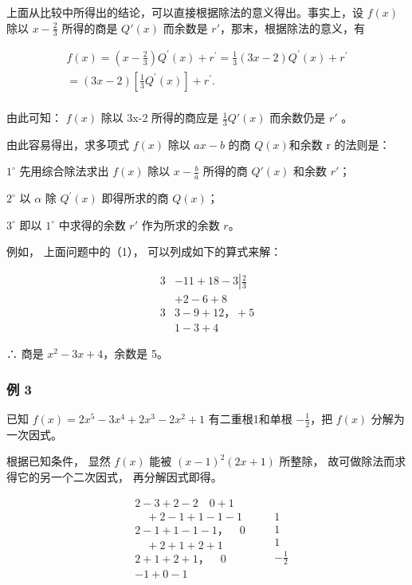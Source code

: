 上面从比较中所得出的结论，可以直接根据除法的意义得出。事实上，设
\(f(x)\) 除以 \(x - \frac{2}{3}\) 所得的商是 \(Q'(x)\) 而余数是
\(r'\)，那末，根据除法的意义，有

\[
\begin{array}{l} f (x) = \left(x - \frac {2}{3}\right) Q ^ {\prime} (x) + r ^ {\prime} = \frac {1}{3} (3 x - 2) Q ^ {\prime} (x) + r ^ {\prime} \\ = (3 x - 2) \left[ \frac {1}{3} Q ^ {\prime} (x) \right] + r ^ {\prime}. \\ \end{array}
\]

由此可知： \(f(x)\) 除以 3x-2 所得的商应是 \(\frac{1}{3}Q'(x)\)
而余数仍是 \(r'\) 。

由此容易得出，求多项式 \(f(x)\) 除以 \(ax - b\) 的商 \(Q(x)\)和余数 r
的法则是：

\(1^{\circ}\) 先用综合除法求出 \(f(x)\) 除以 \(x - \frac{b}{a}\)
所得的商 \(Q'(x)\) 和余数 \(r'\)；

\(2^{\circ}\) 以 \(\alpha\) 除 \(Q^{\prime}(x)\) 即得所求的商 \(Q(x)\)；

\(3^{\circ}\) 即以 \(1^{\circ}\) 中求得的余数 \(r'\) 作为所求的余数
\(r\)。

例如， 上面问题中的（1）， 可以列成如下的算式来解：

\[
\begin{array}{rl} 3 & - 11 + 18 - 3 \left| \frac {2}{3} \right. \\ & + 2 - 6 + 8 \\ 3 & \boxed {3 - 9 + 12\text{，} + 5} \\ & 1 - 3 + 4 \end{array}
\]

∴ 商是 \(x^{2}-3x+4\)，余数是 5。

\subsubsection{例 3}

已知 \(f(x) = 2x^{5} - 3x^{4} + 2x^{3} - 2x^{2} + 1\) 有二重根1和单根
\(-\frac{1}{2}\)，把 \(f(x)\) 分解为一次因式。

 根据已知条件， 显然 \(f(x)\) 能被
\((x - 1)^{2}(2x + 1)\) 所整除， 故可做除法而求得它的另一个二次因式，
再分解因式即得。


\[
\begin{array}{rl} & 2 - 3 + 2 - 2 \quad 0 + 1 \\ & \quad + 2 - 1 + 1 - 1 - 1 \\ & 2 - 1 + 1 - 1 - 1\text{，} \quad 0 \\ & \quad + 2 + 1 + 2 + 1 \\ & 2 + 1 + 2 + 1\text{，} \quad 0 \\ & - 1 + 0 - 1 \end{array} \quad \begin{array}{rl} & 1 \\ & 1 \\ & 1 \\ & - \frac {1}{2} \end{array}
\]

